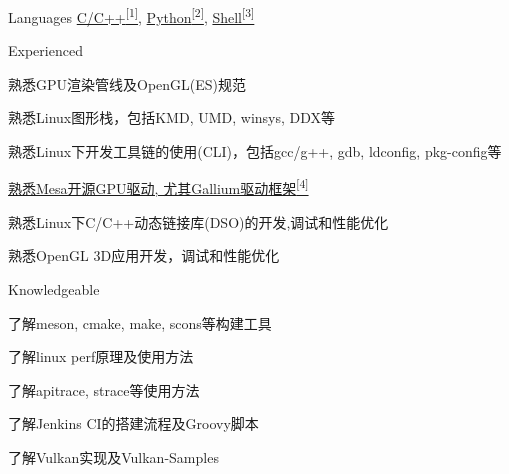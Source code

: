 
\begin{cvskills}
  \cvskill
    {Languages} %
    {\hyperlink{cpp-proj}{C/C++\textsuperscript{[1]}}, \hyperlink{python-proj}{Python\textsuperscript{[2]}}, \hyperlink{shell-proj}{Shell\textsuperscript{[3]}}} %
\end{cvskills}

\begin{cventries}
  \cventry
    {} %
    {Experienced} %
    {} %
    {} %
    {
      \begin{cvitems} %
        \item {熟悉GPU渲染管线及OpenGL(ES)规范}
        \item {熟悉Linux图形栈，包括KMD, UMD, winsys, DDX等}
        \item {熟悉Linux下开发工具链的使用(CLI)，包括gcc/g++, gdb, ldconfig, pkg-config等}
        \item {\hyperlink{mesa-mr}{熟悉Mesa开源GPU驱动, 尤其Gallium驱动框架\textsuperscript{[4]}}}
        \item {熟悉Linux下C/C++动态链接库(DSO)的开发,调试和性能优化}
        \item {熟悉OpenGL 3D应用开发，调试和性能优化}
      \end{cvitems}
    }
  \cventry
    {} %
    {Knowledgeable} %
    {} %
    {} %
    {
      \begin{cvitems} %
        \item {了解meson, cmake, make, scons等构建工具}
        \item {了解linux perf原理及使用方法}
        \item {了解apitrace, strace等使用方法}
        \item {了解Jenkins CI的搭建流程及Groovy脚本}
        \item {了解Vulkan实现及Vulkan-Samples}
      \end{cvitems}
    }
\end{cventries}
